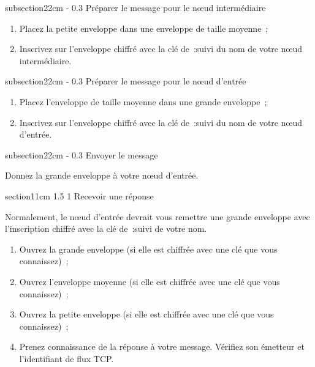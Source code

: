 \documentclass[a4paper,twoside,french]{article}
\makeatletter
\renewcommand\section{\@startsection
  {section}{1}{1cm}%
  {1.5\baselineskip}%
  {1\baselineskip}%
  {\normalfont\Large\bfseries}}%
\renewcommand\subsection{\@startsection
  {subsection}{2}{2cm}%
  {-\baselineskip}%
  {0.3\baselineskip}%
  {\normalfont\normalsize\itshape\bfseries}}%
\makeatother
\begin{document}
  \subsection{Préparer le message pour le n\oe ud intermédiaire}

  \begin{enumerate}
  \item Placez la petite enveloppe dans une enveloppe de taille
    moyenne~;
  \item Inscrivez sur l'enveloppe \og chiffré avec la clé de~:\fg suivi du
    nom de votre n\oe ud intermédiaire.
  \end{enumerate}

  \subsection{Préparer le message pour le n\oe ud d'entrée}

  \begin{enumerate}
  \item Placez l'enveloppe de taille moyenne dans une grande
    enveloppe~;
  \item Inscrivez sur l'enveloppe \og chiffré avec la clé de~:\fg suivi du
    nom de votre n\oe ud d'entrée.
  \end{enumerate}

  \subsection{Envoyer le message}

  Donnez la grande enveloppe à votre n\oe ud d'entrée.

  \section{Recevoir une réponse}

  Normalement, le n\oe ud d'entrée devrait vous remettre une grande
  enveloppe avec l'inscription \og chiffré avec la clé de~:\fg suivi de
  votre nom.
  \begin{enumerate}
  \item Ouvrez la grande enveloppe (si elle est chiffrée avec une clé
    que vous connaissez)~;
  \item Ouvrez l'enveloppe moyenne (si elle est chiffrée avec une clé
    que vous connaissez)~;
  \item Ouvrez la petite enveloppe (si elle est chiffrée avec une clé
    que vous connaissez)~;
  \item Prenez connaissance de la réponse à votre message. Vérifiez
    son émetteur et l'identifiant de flux TCP.
  \end{enumerate}
\end{document}
